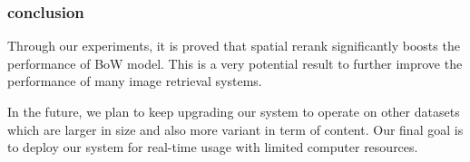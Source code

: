 \begin{frame}
	\frametitle{conclusion}
	Through our experiments, it is proved that spatial rerank significantly boosts the performance of BoW model. This is a very potential result to further improve the performance of many image retrieval systems. 

    In the future, we plan to keep upgrading our system to operate on other datasets which are larger in size and also more variant in term of content. Our final goal is to deploy our system for real-time usage with limited computer resources.
\end{frame}
